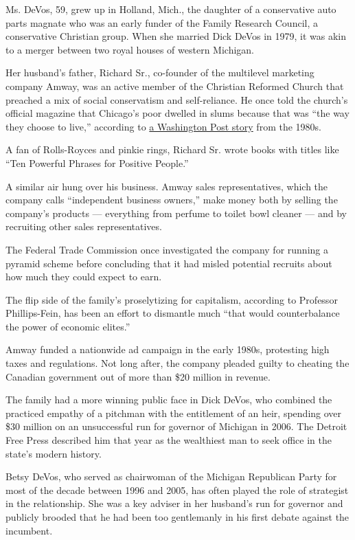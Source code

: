 Ms. DeVos, 59, grew up in Holland, Mich., the daughter of a conservative
auto parts magnate who was an early funder of the Family Research
Council, a conservative Christian group. When she married Dick DeVos in
1979, it was akin to a merger between two royal houses of western
Michigan.

Her husband's father, Richard Sr., co-founder of the multilevel
marketing company Amway, was an active member of the Christian Reformed
Church that preached a mix of social conservatism and self-reliance. He
once told the church's official magazine that Chicago's poor dwelled in
slums because that was ``the way they choose to live,'' according to
\href{https://www.washingtonpost.com/archive/politics/1981/03/14/selling-free-enterprise/951e73a4-c888-48f9-8726-ddc31d15b471/?utm_term=.ba4f34df73b5}{a
Washington Post story} from the 1980s.

A fan of Rolls-Royces and pinkie rings, Richard Sr. wrote books with
titles like ``Ten Powerful Phrases for Positive People.''

A similar air hung over his business. Amway sales representatives, which
the company calls ``independent business owners,'' make money both by
selling the company's products --- everything from perfume to toilet
bowl cleaner --- and by recruiting other sales representatives.

The Federal Trade Commission once investigated the company for running a
pyramid scheme before concluding that it had misled potential recruits
about how much they could expect to earn.

The flip side of the family's proselytizing for capitalism, according to
Professor Phillips-Fein, has been an effort to dismantle much ``that
would counterbalance the power of economic elites.''

Amway funded a nationwide ad campaign in the early 1980s, protesting
high taxes and regulations. Not long after, the company pleaded guilty
to cheating the Canadian government out of more than \$20 million in
revenue.

The family had a more winning public face in Dick DeVos, who combined
the practiced empathy of a pitchman with the entitlement of an heir,
spending over \$30 million on an unsuccessful run for governor of
Michigan in 2006. The Detroit Free Press described him that year as the
wealthiest man to seek office in the state's modern history.

Betsy DeVos, who served as chairwoman of the Michigan Republican Party
for most of the decade between 1996 and 2005, has often played the role
of strategist in the relationship. She was a key adviser in her
husband's run for governor and publicly brooded that he had been too
gentlemanly in his first debate against the incumbent.


